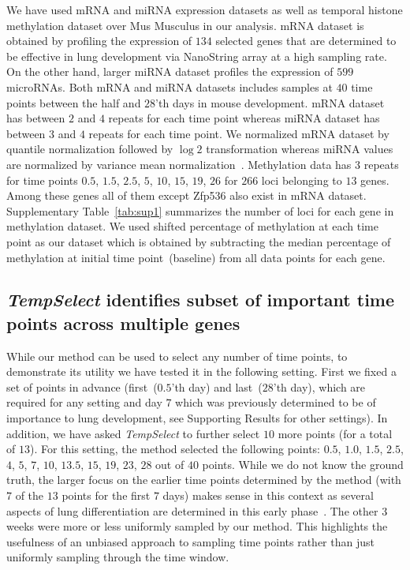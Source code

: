 \documentclass[10pt]{article}
\newcommand{\Tempselect}{\textit{TempSelect}\xspace}
\begin{document}
We have used mRNA and miRNA expression datasets as well as temporal histone
methylation dataset over Mus Musculus in our analysis. mRNA dataset is obtained by profiling the expression of $134$ selected
genes that are determined to be effective in lung development via NanoString array at a
high sampling rate. On the other hand, larger miRNA dataset
profiles the expression of $599$ microRNAs. Both mRNA and
miRNA datasets includes samples at $40$ time points between the half and
$28$'th days in mouse development. mRNA dataset has between $2$ and
$4$ repeats for each time point whereas miRNA dataset has between $3$
and $4$ repeats for each time point. We normalized mRNA dataset by
quantile normalization followed by $\log 2$ transformation whereas
miRNA values are normalized by variance mean normalization~\cite{peltier2008}. Methylation data has $3$ repeats for time
points $0.5$, $1.5$, $2.5$, $5$, $10$, $15$, $19$, $26$ for $266$ loci
belonging to $13$ genes. Among these genes all of them except Zfp536 also exist in
mRNA dataset. Supplementary Table~\ref{tab:sup1} summarizes the number of loci for each gene in methylation
dataset. We used shifted percentage of methylation at each time
point as our dataset which is obtained by subtracting the median percentage of
methylation at initial time point~(baseline) from all data points for each gene.

\subsection{\Tempselect identifies subset of important time points across multiple genes}\label{sec:findsubset}

While our method can be used to select any number of time points, to demonstrate its utility we have tested it
in the following setting. First we fixed a set of points in advance (first~($0.5$'th day) and
last~($28$'th day), which are required for any setting and day $7$ which was
previously determined to be of importance to lung development, see
Supporting Results for other settings). In addition, we have asked
\Tempselect to further select $10$ more points (for a total of $13$). For
this setting, the method selected the following points: $0.5$,
$1.0$, $1.5$, $2.5$, $4$, $5$, $7$, $10$, $13.5$, $15$, $19$, $23$,
$28$ out of $40$ points. While we do not know the ground truth, the larger focus on the
earlier time points determined by the method (with $7$ of the $13$
points for the first $7$ days) makes sense in this context as several
aspects of lung differentiation are determined in this early phase~\cite{guilliams2013}. The other $3$ weeks were more or less
uniformly sampled by our method. This highlights the usefulness of
an unbiased approach to sampling time points rather than just
uniformly sampling through the time window.
\end{document}
